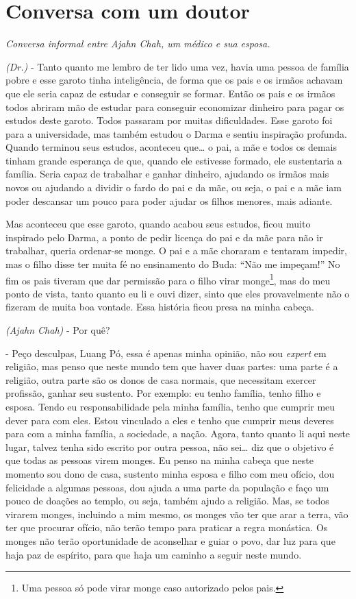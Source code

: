 
\chapter{Conversa com um doutor}

{\itshape
Conversa informal entre Ajahn Chah, um médico e sua esposa.}

\textit{(Dr.)} - Tanto quanto me lembro de ter lido uma vez, havia
uma pessoa de família pobre e esse garoto tinha inteligência, de forma
que os pais e os irmãos achavam que ele seria capaz de estudar e
conseguir se formar. Então os pais e os irmãos todos abriram mão de
estudar para conseguir economizar dinheiro para pagar os estudos deste
garoto. Todos passaram por muitas dificuldades. Esse garoto foi para a
universidade, mas também estudou o Darma e sentiu inspiração profunda.
Quando terminou seus estudos, aconteceu que… o pai, a mãe e todos os
demais tinham grande esperança de que, quando ele estivesse formado,
ele sustentaria a família. Seria capaz de trabalhar e ganhar dinheiro,
ajudando os irmãos mais novos ou ajudando a dividir o fardo do pai e da
mãe, ou seja, o pai e a mãe iam poder descansar um pouco para poder
ajudar os filhos menores, mais adiante. 

Mas aconteceu que esse garoto, quando acabou seus estudos, ficou
muito inspirado pelo Darma, a ponto de pedir licença do pai e da mãe
para não ir trabalhar, queria ordenar-se monge. O pai e a mãe choraram
e tentaram impedir, mas o filho disse ter muita fé no ensinamento do
Buda: “Não me impeçam!” No fim os pais tiveram que dar permissão para o
filho virar monge\footnote{Uma pessoa só pode virar monge caso
autorizado pelos pais.}, mas do meu ponto de vista, tanto quanto eu li
e ouvi dizer, sinto que eles provavelmente não o fizeram de muita boa
vontade. Essa história ficou presa na minha cabeça. 

\textit{(Ajahn Chah) }- Por quê? 

- Peço desculpas, Luang Pó, essa é apenas minha opinião, não sou
\textit{expert} em religião, mas penso que neste mundo tem que haver
duas partes: uma parte é a religião, outra parte são os donos de casa
normais, que necessitam exercer profissão, ganhar seu sustento. Por
exemplo: eu tenho família, tenho filho e esposa. Tendo eu
responsabilidade pela minha família, tenho que cumprir meu dever para
com eles. Estou vinculado a eles e tenho que cumprir meus deveres para
com a minha família, a sociedade, a nação. Agora, tanto quanto li aqui
neste lugar, talvez tenha sido escrito por outra pessoa, não sei… diz
que o objetivo é que todas as pessoas virem monges. Eu penso na minha
cabeça que neste momento sou dono de casa, sustento minha esposa e
filho com meu ofício, dou felicidade a algumas pessoas, dou ajuda a uma
parte da população e faço um pouco de doações ao templo, ou seja,
também ajudo a religião. Mas, se todos virarem monges, incluindo a mim
mesmo, os monges vão ter que arar a terra, vão ter que procurar ofício,
não terão tempo para praticar a regra monástica. Os monges não terão
oportunidade de aconselhar e guiar o povo, dar luz para que haja paz de
espírito, para que haja um caminho a seguir neste mundo. 

